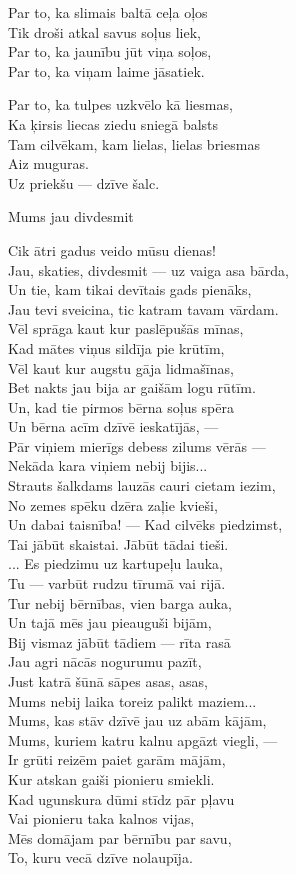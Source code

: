 \documentclass[14pt]{extarticle}
\begin{document}
{{Par to, ka slimais baltā ceļa oļos\\
Tik droši atkal savus soļus liek,\\
Par to, ka jaunību jūt viņa soļos,\\
Par to, ka viņam laime jāsatiek.

Par to, ka tulpes uzkvēlo kā liesmas,\\
Ka ķirsis liecas ziedu sniegā balsts\\
Tam cilvēkam, kam lielas, lielas briesmas\\
Aiz muguras.\\
Uz priekšu --- dzīve šalc.

\newpage
{\large \sc Mums jau divdesmit}

Cik ātri gadus veido mūsu dienas!\\
Jau, skaties, divdesmit --- uz vaiga asa bārda,\\
Un tie, kam tikai devītais gads pienāks,\\
Jau tevi sveicina, tic katram tavam vārdam. \\
Vēl sprāga kaut kur paslēpušās mīnas,\\
Kad mātes viņus sildīja pie krūtīm,\\
Vēl kaut kur augstu gāja lidmašīnas,\\
Bet nakts jau bija ar gaišām logu rūtīm.\\
Un, kad tie pirmos bērna soļus spēra\\
Un bērna acīm dzīvē ieskatījās, ---\\
Pār viņiem mierīgs debess zilums vērās ---\\
Nekāda kara viņiem nebij bijis...\\
Strauts šalkdams lauzās cauri cietam iezim,\\
No zemes spēku dzēra zaļie kvieši,\\
Un dabai taisnība! --- Kad cilvēks piedzimst,\\
Tai jābūt skaistai. Jābūt tādai tieši.\\
... Es piedzimu uz kartupeļu lauka,\\
Tu --- varbūt rudzu tīrumā vai rijā.\\
Tur nebij bērnības, vien barga auka,\\
Un tajā mēs jau pieauguši bijām,\\
Bij vismaz jābūt tādiem --- rīta rasā\\
Jau agri nācās nogurumu pazīt,\\
Just katrā šūnā sāpes asas, asas,\\
Mums nebij laika toreiz palikt maziem...\\
Mums, kas stāv dzīvē jau uz abām kājām,\\
Mums, kuriem katru kalnu apgāzt viegli, ---\\
Ir grūti reizēm paiet garām mājām,\\
Kur atskan gaiši pionieru smiekli.\\
Kad ugunskura dūmi stīdz pār pļavu\\
Vai pionieru taka kalnos vijas,\\
Mēs domājam par bērnību par savu,\\
To, kuru vecā dzīve nolaupīja.

}}
\end{document}
